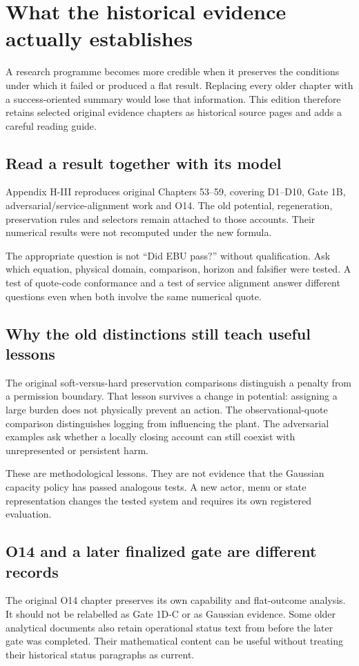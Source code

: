 \chapter{What the historical evidence actually establishes}\label{ch:evidence}
A research programme becomes more credible when it preserves the conditions
under which it failed or produced a flat result. Replacing every older
chapter with a success-oriented summary would lose that information. This
edition therefore retains selected original evidence chapters as historical
source pages and adds a careful reading guide.

\section{Read a result together with its model}
Appendix H-III reproduces original Chapters 53--59, covering D1--D10,
Gate 1B, adversarial/service-alignment work and O14. The old potential,
regeneration, preservation rules and selectors remain attached to those
accounts. Their numerical results were not recomputed under the new formula.

The appropriate question is not ``Did EBU pass?'' without qualification.
Ask which equation, physical domain, comparison, horizon and falsifier were
tested. A test of quote-code conformance and a test of service alignment
answer different questions even when both involve the same numerical quote.

\section{Why the old distinctions still teach useful lessons}
The original soft-versus-hard preservation comparisons distinguish a penalty
from a permission boundary. That lesson survives a change in potential:
assigning a large burden does not physically prevent an action. The
observational-quote comparison distinguishes logging from influencing the
plant. The adversarial examples ask whether a locally closing account can
still coexist with unrepresented or persistent harm.

These are methodological lessons. They are not evidence that the Gaussian
capacity policy has passed analogous tests. A new actor, menu or state
representation changes the tested system and requires its own registered
evaluation.

\section{O14 and a later finalized gate are different records}
The original O14 chapter preserves its own capability and flat-outcome
analysis. It should not be relabelled as Gate 1D-C or as Gaussian evidence.
Some older analytical documents also retain operational status text from
before the later gate was completed. Their mathematical content can be
useful without treating their historical status paragraphs as current.

